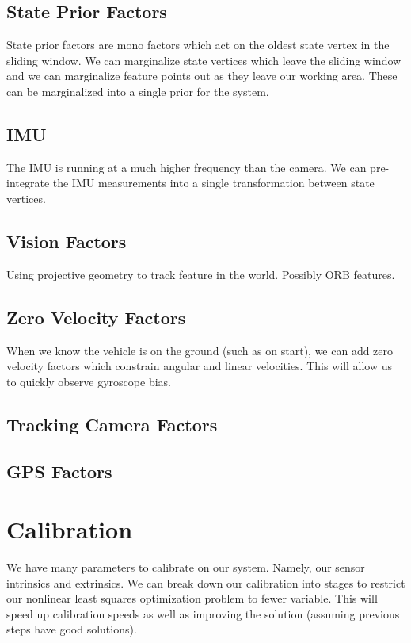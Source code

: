 \documentclass[11pt]{article}
\begin{document}
\subsection{State Prior Factors}
State prior factors are mono factors which act on the oldest state vertex in the sliding window. We can marginalize state vertices which leave the sliding window and we can marginalize feature points out as they leave our working area. These can be marginalized into a single prior for the system.

\subsection{IMU}
The IMU is running at a much higher frequency than the camera. We can pre-integrate the IMU measurements into a single transformation between state vertices.

\subsection{Vision Factors}
Using projective geometry to track feature in the world. Possibly ORB features.

\subsection{Zero Velocity Factors} 
When we know the vehicle is on the ground (such as on start), we can add zero velocity factors which constrain angular and linear velocities. This will allow us to quickly observe gyroscope bias.
\subsection{Tracking Camera Factors}

\subsection{GPS Factors}

\section{Calibration}
We have many parameters to calibrate on our system. Namely, our sensor intrinsics and extrinsics. We can break down our calibration into stages to restrict our nonlinear least squares optimization problem to fewer variable. This will speed up calibration speeds as well as improving the solution (assuming previous steps have good solutions).
\end{document}
